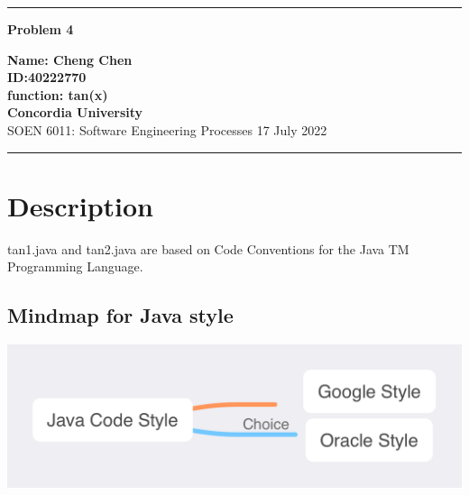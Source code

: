 \documentclass[10pt,a4paper,twoside]{article}
\begin{document}
\begin{center}
\hrule

\vspace{.4cm}
{\bf {\Huge Problem 4}}
\vspace{.2cm}
\end{center}
{\bf Name: Cheng Chen}  \\
{\bf ID:40222770}\\
{\bf function: tan(x)}\\
{\bf Concordia University}\\
SOEN 6011: Software Engineering Processes {\bf  } \hspace{\fill}  17 July  2022 \\
\hrule






\section{Description}
tan1.java and tan2.java are based on Code Conventions for the Java TM Programming Language.\cite{ref1}
\subsection{Mindmap for Java style}
\includegraphics[scale=0.60]{javacodestyle.png}
\end{document}

